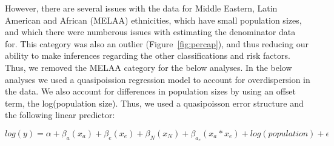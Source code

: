 \documentclass{article}
\begin{document}
However, there are several issues with the data for Middle Eastern, Latin American and African (MELAA) ethnicities, which have small population sizes, and which there were numberous issues with estimating the denominator data for. This category was also an outlier (Figure~\ref{fig:percap}), and thus reducing our ability to make inferences regarding the other classifications and risk factors. Thus, we removed the MELAA category for the below analyses. In the below analyses we used a quasipoission regression model to account for overdispersion in the data. We also account for differences in population sizes by using an offset term, the log(population size). Thus, we used a quasipoisson error structure and the following linear predictor:

\begin{equation} \label{eq:reg}
 log(y) = \alpha + \beta _a (x_a)+ \beta _e(x_e)+ \beta _N (x_N) + \beta _a_e(x_a * x_e)+ log(population)  + \epsilon
  \end{equation}
\end{document}
